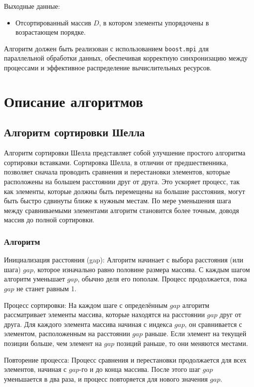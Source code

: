 \documentclass{report}
\begin{document}
Выходные данные:
\begin{itemize}
    \item Отсортированный массив $D$, в котором элементы упорядочены в возрастающем порядке.
\end{itemize}

Алгоритм должен быть реализован с использованием \texttt{boost.mpi} для параллельной обработки данных, обеспечивая корректную синхронизацию между процессами и эффективное распределение вычислительных ресурсов.

\newpage
\section*{Описание алгоритмов}

\subsection*{Алгоритм сортировки Шелла}

Алгоритм сортировки Шелла представляет собой улучшение простого алгоритма сортировки вставками. Сортировка Шелла, в отличии от предшественника, позволяет сначала проводить сравнения и перестановки элементов, которые расположены на большем расстоянии друг от друга. Это ускоряет процесс, так как элементы, которые должны быть перемещены на большие расстояния, могут быть быстро сдвинуты ближе к нужным местам. По мере уменьшения шага между сравниваемыми элементами алгоритм становится более точным, доводя массив до полной сортировки.

\subsubsection*{Алгоритм}
Инициализация расстояния (gap): Алгоритм начинает с выбора расстояния (или шага) $gap$, которое изначально равно половине размера массива. С каждым шагом алгоритм уменьшает $gap$, обычно деля его пополам. Процесс продолжается, пока $gap$ не станет равным 1.

Процесс сортировки: На каждом шаге с определённым $gap$ алгоритм рассматривает элементы массива, которые находятся на расстоянии $gap$ друг от друга. Для каждого элемента массива начиная с индекса $gap$, он сравнивается с элементом, расположенным на расстоянии $gap$ раньше. Если элемент на текущей позиции больше, чем элемент на $gap$ позиций раньше, то они меняются местами.

Повторение процесса: Процесс сравнения и перестановки продолжается для всех элементов, начиная с $gap$-го и до конца массива. После этого шаг $gap$ уменьшается в два раза, и процесс повторяется для нового значения $gap$.
\end{document}
